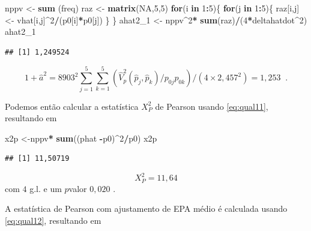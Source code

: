 \documentclass[]{book}
\newenvironment{Shaded}{\begin{snugshade}}{\end{snugshade}}
\newcommand{\KeywordTok}[1]{\textcolor[rgb]{0.13,0.29,0.53}{\textbf{#1}}}
\newcommand{\DecValTok}[1]{\textcolor[rgb]{0.00,0.00,0.81}{#1}}
\newcommand{\StringTok}[1]{\textcolor[rgb]{0.31,0.60,0.02}{#1}}
\newcommand{\OtherTok}[1]{\textcolor[rgb]{0.56,0.35,0.01}{#1}}
\newcommand{\ControlFlowTok}[1]{\textcolor[rgb]{0.13,0.29,0.53}{\textbf{#1}}}
\newcommand{\OperatorTok}[1]{\textcolor[rgb]{0.81,0.36,0.00}{\textbf{#1}}}
\newcommand{\NormalTok}[1]{#1}
\theoremstyle{definition}
\theoremstyle{definition}
\theoremstyle{definition}
\theoremstyle{remark}
\begin{document}
\begin{Shaded}
\begin{Highlighting}[]
\NormalTok{nppv <-}\StringTok{ }\KeywordTok{sum}\NormalTok{ (freq)}
\NormalTok{raz <-}\StringTok{ }\KeywordTok{matrix}\NormalTok{(}\OtherTok{NA}\NormalTok{,}\DecValTok{5}\NormalTok{,}\DecValTok{5}\NormalTok{)}
\ControlFlowTok{for}\NormalTok{(i }\ControlFlowTok{in} \DecValTok{1}\OperatorTok{:}\DecValTok{5}\NormalTok{)\{}
  \ControlFlowTok{for}\NormalTok{(j }\ControlFlowTok{in} \DecValTok{1}\OperatorTok{:}\DecValTok{5}\NormalTok{)\{}
\NormalTok{    raz[i,j]<-}\StringTok{ }\NormalTok{vhat[i,j]}\OperatorTok{^}\DecValTok{2}\OperatorTok{/}\NormalTok{(p0[i]}\OperatorTok{*}\NormalTok{p0[j])}
\NormalTok{  \}}
\NormalTok{\}}
\NormalTok{ahat2_}\DecValTok{1}\NormalTok{ <-}\StringTok{ }\NormalTok{nppv}\OperatorTok{^}\DecValTok{2}\OperatorTok{*}\StringTok{ }\KeywordTok{sum}\NormalTok{(raz)}\OperatorTok{/}\NormalTok{(}\DecValTok{4}\OperatorTok{*}\NormalTok{deltahatdot}\OperatorTok{^}\DecValTok{2}\NormalTok{)}
\NormalTok{ahat2_}\DecValTok{1}
\end{Highlighting}
\end{Shaded}

\begin{verbatim}
## [1] 1,249524
\end{verbatim}

\[
1+\hat{a}^{2}=8903^{2}\sum\limits_{j=1}^{5}\sum\limits_{k=1}^{5}\left( \hat{V}_{p}^{2}\left( \hat{p}_{j},\hat{p}_{k}\right) /p_{0j}p_{0k}\right) /\left(
4\times 2,457^{2}\right) =1,253\;\;. 
\]

Podemos então calcular a estatística \(X_{P}^{2}\) de Pearson usando
\eqref{eq:qual11}, resultando em

\begin{Shaded}
\begin{Highlighting}[]
\NormalTok{x2p <-nppv}\OperatorTok{*}\StringTok{ }\KeywordTok{sum}\NormalTok{((phat }\OperatorTok{-}\NormalTok{p0)}\OperatorTok{^}\DecValTok{2}\OperatorTok{/}\NormalTok{p0)}
\NormalTok{x2p}
\end{Highlighting}
\end{Shaded}

\begin{verbatim}
## [1] 11,50719
\end{verbatim}

\[
X_{P}^{2}=11,64 
\] com \(4\) g.l. e um \(p\)valor \(0,020\) .

A estatística de Pearson com ajustamento de EPA médio é calculada usando
\eqref{eq:qual12}, resultando em
\end{document}
